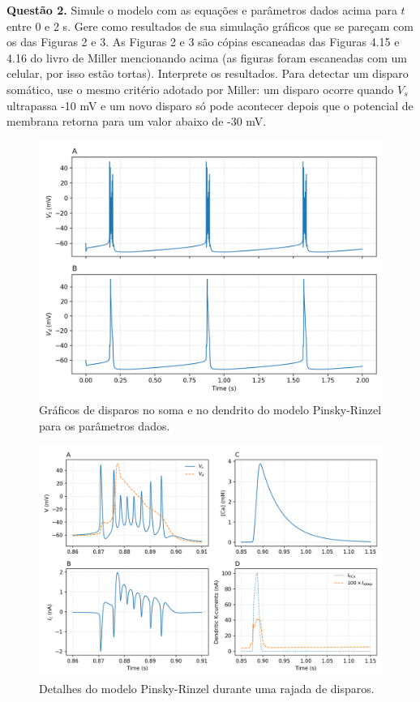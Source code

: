 \documentclass[english,11pt,a4paper]{article}
\begin{document}
	\noindent \textbf{Questão 2.} Simule o modelo com as equações e parâmetros dados acima para \(t\) entre 0 e 2 s. Gere como resultados de sua simulação gráficos que se pareçam com os das Figuras 2 e 3. As Figuras 2 e 3 são cópias escaneadas das Figuras 4.15 e 4.16 do livro de Miller mencionando acima (as figuras foram escaneadas com um celular, por isso estão tortas). Interprete os resultados. Para detectar um disparo somático, use o mesmo critério adotado por Miller: um disparo ocorre quando \(V_s\) ultrapassa -10 mV e um novo disparo só pode acontecer depois que o potencial de membrana retorna para um valor abaixo de -30 mV.
	
	\begin{figure}[H]
		\centering
		\includegraphics[width=12cm]{../figures/ex_2_1.png}
		\caption{Gráficos de disparos no soma e no dendrito do modelo Pinsky-Rinzel para os parâmetros dados.}
	\end{figure}
	
	
	
	\begin{figure}[H]
		\centering
		\includegraphics[width=12cm]{../figures/ex_2_2.png}
		\caption{Detalhes do modelo Pinsky-Rinzel durante uma rajada de disparos.}
	\end{figure}
	
\end{document}
